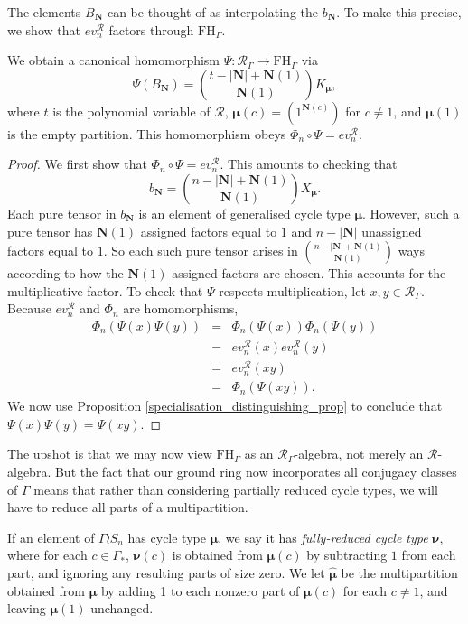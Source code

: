 \documentclass[ALCO,Unicode]{cedram}
\newcommand{\bs}{\boldsymbol}
\newcommand{\RGamma}{\mathcal{R}_{\Gamma}}
\newcommand{\FHG}{\mathrm{FH}_{\Gamma}}
\newcommand{\RGamma}{\mathcal{R}_{\Gamma}}
\newcommand{\FHG}{\mathrm{FH}_{\Gamma}}
\begin{document}
The elements $B_{\mathbf{N}}$ can be thought of as interpolating the $b_{\mathbf{N}}$. To make this precise, we show that $ev_n^{\mathcal{R}}$ factors through $\FHG$.

\begin{corollary} \label{coeff_compatibility_cor}
We obtain a canonical homomorphism $\Psi: \RGamma \to \FHG$ via
\[
\Psi( B_{\mathbf{N}}) = \binom{t - |\mathbf{N}| + \mathbf{N}(1)}{\mathbf{N}(1)} K_{\bs \mu},
\]
where $t$ is the polynomial variable of $\mathcal{R}$, $\bs \mu(c) = (1^{\mathbf{N}(c)})$ for $c \neq 1$, and $\bs \mu(1)$ is the empty partition. This homomorphism obeys $\Phi_n \circ \Psi = ev_n^{\mathcal{R}}$.
\end{corollary}
\begin{proof}
We first show that $\Phi_n \circ \Psi = ev_n^{\mathcal{R}}$. This amounts to checking that
\[
b_{\mathbf{N}} = \binom{n - |\mathbf{N}| + \mathbf{N}(1)}{\mathbf{N}(1)} X_{\bs \mu}.
\]
Each pure tensor in $b_{\mathbf{N}}$ is an element of generalised cycle type $\bs \mu$. However, such a pure tensor has $\mathbf{N}(1)$ assigned factors equal to $1$ and $n - |\mathbf{N}|$ unassigned factors equal to $1$. So each such pure tensor arises in $\binom{n - |\mathbf{N}| + \mathbf{N}(1)}{\mathbf{N}(1)}$ ways according to how the $\mathbf{N}(1)$ assigned factors are chosen. This accounts for the multiplicative factor. To check that $\Psi$ respects multiplication, let $x,y \in \RGamma$. Because $ev_n^{\mathcal{R}}$ and $\Phi_n$ are homomorphisms,
\begin{eqnarray*}
\Phi_n(\Psi(x)\Psi(y)) &=& \Phi_n(\Psi(x))\Phi_n(\Psi(y)) \\
&=& ev_n^{\mathcal{R}}(x) ev_n^{\mathcal{R}}(y) \\
&=& ev_n^{\mathcal{R}}(xy) \\
&=& \Phi_n(\Psi(xy)).
\end{eqnarray*}
We now use Proposition \ref{specialisation_distinguishing_prop} to conclude that $\Psi(x)\Psi(y) = \Psi(xy)$.
\end{proof}

The upshot is that we may now view $\FHG$ as an $\RGamma$-algebra, not merely an $\mathcal{R}$-algebra. But the fact that our ground ring now incorporates all conjugacy classes of $\Gamma$ means that rather than considering partially reduced cycle types, we will have to reduce all parts of a multipartition.
\begin{definition}
If an element of $\Gamma \wr S_n$ has cycle type $\bs \mu$, we say it has \emph{fully-reduced cycle type} $\bs \nu$, where for each $c \in \Gamma_*$, $\bs \nu(c)$ is obtained from $\bs \mu(c)$ by subtracting $1$ from each part, and ignoring any resulting parts of size zero. We let $\bm\hat{\bs \mu}$ be the multipartition obtained from $\bs \mu$ by adding 1 to each nonzero part of $\bs \mu(c)$ for each $c \neq 1$, and leaving $\bs \mu(1)$ unchanged.
\end{definition}
\end{document}
